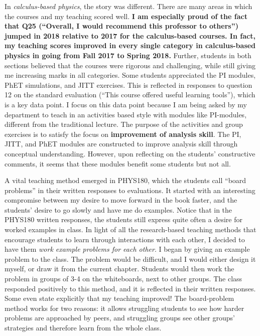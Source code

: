 \documentclass[../../main.tex]{subfiles}
\begin{document}
In \textit{calculus-based physics}, the story was different.  There are many areas in which the courses and my teaching scored well.  \textbf{I am especially proud of the fact that Q25 (``Overall, I would recommend this professor to others'') jumped in 2018 relative to 2017 for the calculus-based courses.  In fact, my teaching scores improved in every single category in calculus-based physics in going from Fall 2017 to Spring 2018.}  Further, students in both sections believed that the courses were rigorous and challenging, while still giving me increasing marks in all categories.  Some students appreciated the PI modules, PhET simulations, and JITT exercises.  This is reflected in responses to question 12 on the standard evaluation (``This course offered useful learning tools''), which is a key data point.  I focus on this data point because I am being asked by my department to teach in an activities based style with modules like PI-modules, different from the traditional lecture.  The purpose of the activities and group exercises is to satisfy the focus on \textbf{improvement of analysis skill}.  The PI, JITT, and PhET modules are constructed to improve analysis skill through conceptual understanding.  However, upon reflecting on the students' constructive comments, it seems that these modules benefit some students but not all. \\ \hspace{0.1cm}

A vital teaching method emerged in PHYS180, which the students call ``board problems'' in their written responses to evaluations.  It started with an interesting compromise between my desire to move forward in the book faster, and the students' desire to go slowly and have me do examples.  Notice that in the PHYS180 written responses, the students still express quite often a desire for worked examples in class.  In light of all the research-based teaching methods that encourage students to learn through interactions with each other, I decided to have them \textit{work example problems for each other}.  I began by giving an example problem to the class.  The problem would be difficult, and I would either design it myself, or draw it from the current chapter.  Students would then work the problem in groups of 3-4 on the whiteboards, next to other groups.  The class responded positively to this method, and it is reflected in their written responses.  Some even state explicitly that my teaching improved!  The board-problem method works for two reasons: it allows struggling students to see how harder problems are approached by peers, and struggling groups see other groups' strategies and therefore learn from the whole class.  \\ \hspace{0.1cm}
\end{document}
